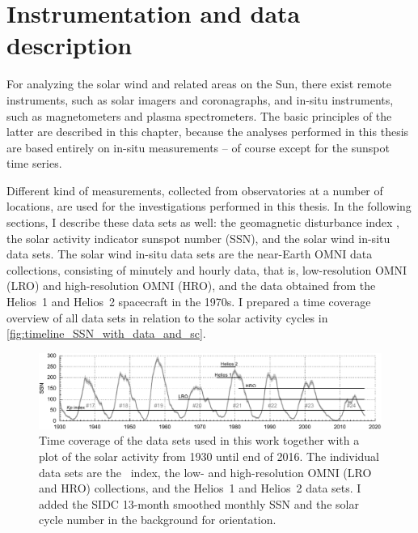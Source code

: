 
\chapter{Instrumentation and data description}
\label{chap:data}
For analyzing the solar wind and related areas on the Sun, there exist remote instruments, such as solar imagers and coronagraphs, and in-situ instruments, such as magnetometers and plasma spectrometers. The basic principles of the latter are described in this chapter, because the analyses performed in this thesis are based entirely on in-situ measurements -- of course except for the sunspot time series.

Different kind of measurements, collected from observatories at a number of locations, are used for the investigations performed in this thesis. In the following sections, I describe these data sets as well: the geomagnetic disturbance index \Kp{}, the solar activity indicator sunspot number (SSN), and the solar wind in-situ data sets. The solar wind in-situ data sets are the near-Earth OMNI data collections, consisting of minutely and hourly data, that is, low-resolution OMNI (LRO) and high-resolution OMNI (HRO), and the data obtained from the Helios~1 and Helios~2 spacecraft in the 1970s. I prepared a time coverage overview of all data sets in relation to the solar activity cycles in \autoref{fig:timeline_SSN_with_data_and_sc}.
\begin{figure}[htb]
	\centering
	\includegraphics[width=\textwidth]{figures_of_mine/gnuplots/timeline_SSN_with_data_and_sc.pdf}
	\caption[I created the figure myself.]
	{Time coverage of the data sets used in this work together with a plot of the solar activity from 1930 until end of 2016. The individual data sets are the \Kp~index, the low- and high-resolution OMNI (LRO and HRO) collections, and the Helios~1 and Helios~2 data sets. I added the SIDC 13-month smoothed monthly SSN and the solar cycle number in the background for orientation.}
	\label{fig:timeline_SSN_with_data_and_sc}
\end{figure}


